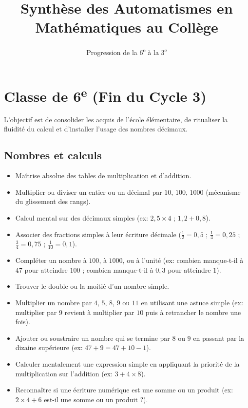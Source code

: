 \documentclass[11pt,a4paper]{article}
\title{\textbf{Synthèse des Automatismes en Mathématiques au Collège}}
\author{Progression de la 6\textsuperscript{e} à la 3\textsuperscript{e}}
\date{}
\begin{document}
\maketitle

\section{Classe de 6\textsuperscript{e} (Fin du Cycle 3)}
L'objectif est de consolider les acquis de l'école élémentaire, de ritualiser la fluidité du calcul et d'installer l'usage des nombres décimaux.

\subsection*{Nombres et calculs}
\begin{itemize}[label=,leftmargin=*]
    \item Maîtrise absolue des tables de multiplication et d'addition.
    \item Multiplier ou diviser un entier ou un décimal par $10$, $100$, $1000$ (mécanisme du glissement des rangs).
    \item Calcul mental sur des décimaux simples (ex: $2,5 \times 4$ ; $1,2 + 0,8$).
    \item Associer des fractions simples à leur écriture décimale ($\frac{1}{2} = 0,5$ ; $\frac{1}{4} = 0,25$ ; $\frac{3}{4} = 0,75$ ; $\frac{1}{10} = 0,1$).
    \item Compléter un nombre à $100$, à $1000$, ou à l'unité (ex: combien manque-t-il à $47$ pour atteindre $100$ ; combien manque-t-il à $0,3$ pour atteindre $1$).
    \item Trouver le double ou la moitié d'un nombre simple.
    \item Multiplier un nombre par $4$, $5$, $8$, $9$ ou $11$ en utilisant une astuce simple (ex: multiplier par $9$ revient à multiplier par $10$ puis à retrancher le nombre une fois).
    \item Ajouter ou soustraire un nombre qui se termine par $8$ ou $9$ en passant par la dizaine supérieure (ex: $47 + 9 = 47 + 10 - 1$).
    \item Calculer mentalement une expression simple en appliquant la priorité de la multiplication sur l'addition (ex: $3 + 4 \times 8$).
    \item Reconnaître si une écriture numérique est une somme ou un produit (ex: $2 \times 4 + 6$ est-il une somme ou un produit ?).
\end{itemize}
\end{document}
